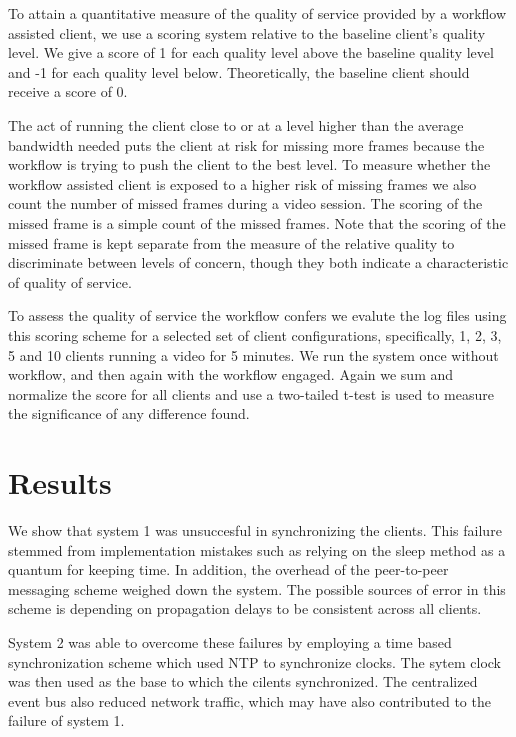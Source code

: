 \documentclass[10pt]{article}
\begin{document}
To attain a quantitative measure of the quality of service provided by
a workflow assisted client, we use a scoring system relative to the
baseline client's quality level.  We give a score of 1 for each
quality level above the baseline quality level and -1 for each quality
level below.  Theoretically, the baseline client should receive a
score of 0.

The act of running the client close to or at a level higher than the
average bandwidth needed puts the client at risk for missing more
frames because the workflow is trying to push the client to the best
level.  To measure whether the workflow assisted client is exposed to
a higher risk of missing frames we also count the number of missed
frames during a video session.  The scoring of the missed frame is a
simple count of the missed frames.  Note that the scoring of the
missed frame is kept separate from the measure of the relative quality
to discriminate between levels of concern, though they both indicate a
characteristic of quality of service.

To assess the quality of service the workflow confers we evalute the
log files using this scoring scheme for a selected set of client
configurations, specifically, 1, 2, 3, 5 and 10 clients running a
video for 5 minutes.  We run the system once without workflow, and
then again with the workflow engaged.  Again we sum and normalize the
score for all clients and use a two-tailed t-test is used to measure
the significance of any difference found.


\section{Results} \label{results}

We show that system 1 was unsuccesful in synchronizing the clients.
This failure stemmed from implementation mistakes such as relying on
the sleep method as a quantum for keeping time.  In addition, the
overhead of the peer-to-peer messaging scheme weighed down the system.
The possible sources of error in this scheme is depending on
propagation delays to be consistent across all clients.

System 2 was able to overcome these failures by employing a time based
synchronization scheme which used NTP to synchronize clocks.  The
sytem clock was then used as the base to which the cilents
synchronized.  The centralized event bus also reduced network traffic,
which may have also contributed to the failure of system 1.
\end{document}
